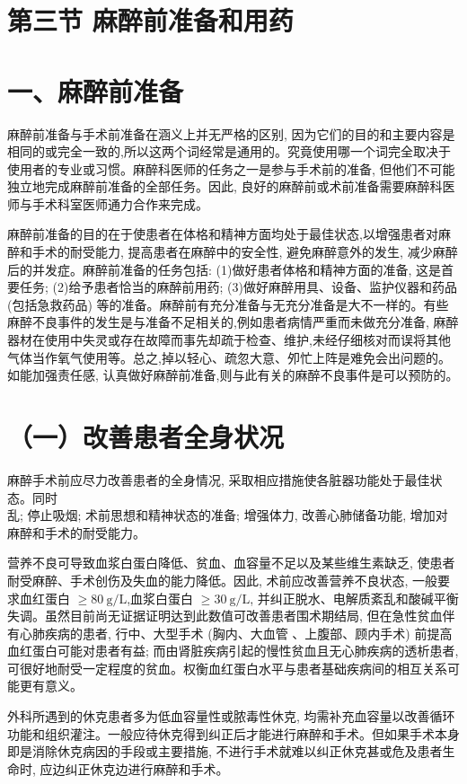 \documentclass[10pt]{article}
\begin{document}
\section*{第三节 麻醉前准备和用药}
\section*{一、麻醉前准备}
麻醉前准备与手术前准备在涵义上并无严格的区别, 因为它们的目的和主要内容是相同的或完全一致的,所以这两个词经常是通用的。究竟使用哪一个词完全取决于使用者的专业或习惯。麻醉科医师的任务之一是参与手术前的准备, 但他们不可能独立地完成麻醉前准备的全部任务。因此, 良好的麻醉前或术前准备需要麻醉科医师与手术科室医师通力合作来完成。

麻醉前准备的目的在于使患者在体格和精神方面均处于最佳状态,以增强患者对麻醉和手术的耐受能力, 提高患者在麻醉中的安全性, 避免麻醉意外的发生, 减少麻醉后的并发症。麻醉前准备的任务包括: (1)做好患者体格和精神方面的准备, 这是首要任务; (2)给予患者恰当的麻醉前用药; (3)做好麻醉用具、设备、监护仪器和药品 (包括急救药品) 等的准备。麻醉前有充分准备与无充分准备是大不一样的。有些麻醉不良事件的发生是与准备不足相关的,例如患者病情严重而未做充分准备, 麻醉器材在使用中失灵或存在故障而事先却疏于检查、维护,未经仔细核对而误将其他气体当作氧气使用等。总之,掉以轻心、疏忽大意、夘忙上阵是难免会出问题的。如能加强责任感, 认真做好麻醉前准备,则与此有关的麻醉不良事件是可以预防的。

\section*{（一）改善患者全身状况}
麻醉手术前应尽力改善患者的全身情况, 采取相应措施使各脏器功能处于最佳状态。同时\\
乱; 停止吸烟; 术前思想和精神状态的准备; 增强体力, 改善心肺储备功能, 增加对麻醉和手术的耐受能力。

营养不良可导致血浆白蛋白降低、贫血、血容量不足以及某些维生素缺乏, 使患者耐受麻醉、手术创伤及失血的能力降低。因此, 术前应改善营养不良状态, 一般要求血红蛋白 $\geqslant 80 \mathrm{~g} / \mathrm{L}$,血浆白蛋白 $\geqslant 30 \mathrm{~g} / \mathrm{L}$, 并纠正脱水、电解质紊乱和酸碱平衡失调。虽然目前尚无证据证明达到此数值可改善患者围术期结局, 但在急性贫血伴有心肺疾病的患者, 行中、大型手术 (胸内、大血管 、上腹部、顾内手术) 前提高血红蛋白可能对患者有益; 而由肾脏疾病引起的慢性贫血且无心肺疾病的透析患者,可很好地耐受一定程度的贫血。权衡血红蛋白水平与患者基础疾病间的相互关系可能更有意义。

外科所遇到的休克患者多为低血容量性或脓毒性休克, 均需补充血容量以改善循环功能和组织灌注。一般应待休克得到纠正后才能进行麻醉和手术。但如果手术本身即是消除休克病因的手段或主要措施, 不进行手术就难以纠正休克甚或危及患者生命时, 应边纠正休克边进行麻醉和手术。
\end{document}
